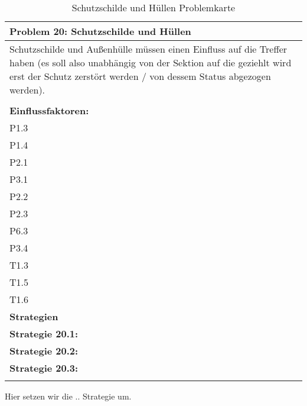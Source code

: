 \documentclass[fontsize=12pt,paper=a4,twoside]{scrartcl}
\begin{document}
\begin{table}[H]
    \centering
    \begin{tabular}{|p{15cm}|}
    \hline
          \textbf{Problem 20: Schutzschilde und Hüllen }  \\ \hline
	Schutzschilde und Außenhülle müssen einen Einfluss auf die Treffer haben (es soll also unabhängig von der Sektion auf die geziehlt wird erst der Schutz zerstört werden / von dessem Status abgezogen werden). \\
         \\ \hline
          \textbf{Einflussfaktoren: } \\
	P1.3 \\
	P1.4 \\
	P2.1 \\
	P3.1 \\
	P2.2 \\
	P2.3 \\
	P6.3 \\
	P3.4 \\
	T1.3 \\
	T1.5 \\
	T1.6 \\
          \hline
          \textbf{Strategien} \\ \hline
            {}          
           \label{strategie:20.1}     
          \textbf{Strategie 20.1:}  \\        
  {}          
           \label{strategie:20.2}              
          \textbf{Strategie 20.2:}  \\
	 {}          
           \label{strategie:20.3}     
          \textbf{Strategie 20.3: }  \\ 
	 \\ \hline
    \end{tabular}

    \caption{Schutzschilde und Hüllen Problemkarte}
    \label{tab:ProblemKarte20}
\end{table}
Hier setzen wir die .. Strategie um. \\
\end{document}
